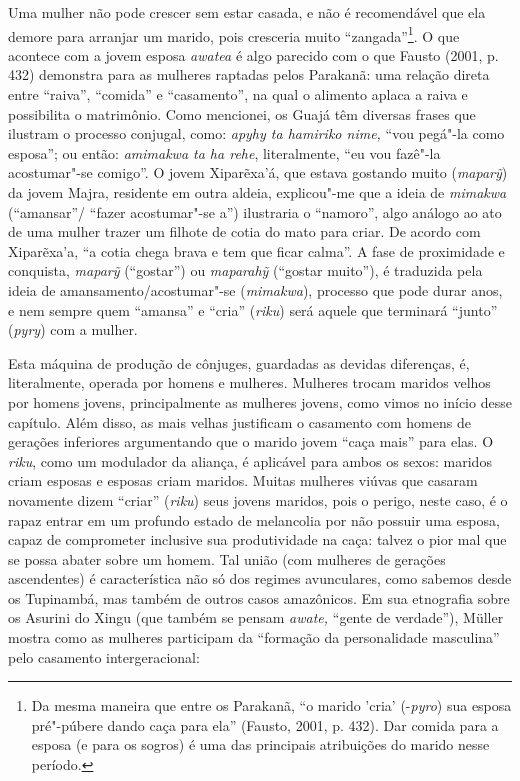 Uma mulher não pode crescer sem estar casada, e não é recomendável que
ela demore para arranjar um marido, pois cresceria muito
``zangada''\footnote{Da mesma maneira que entre os Parakanã, ``o marido
  'cria' (-\emph{pyro}) sua esposa pré"-púbere dando caça para ela''
  (Fausto, 2001, p. 432). Dar comida para a esposa (e para os sogros) é uma
  das principais atribuições do marido nesse período.}. O que acontece
com a jovem esposa \emph{awatea} é algo parecido com o que Fausto
(2001, p. 432) demonstra para as mulheres raptadas pelos Parakanã: uma
relação direta entre ``raiva'', ``comida'' e ``casamento'', na qual o
alimento aplaca a raiva e possibilita o matrimônio. Como mencionei, os
Guajá têm diversas frases que ilustram o processo conjugal, como:
\emph{apyhy ta hamiriko nime,} ``vou pegá"-la como esposa''; ou então:
\emph{amimakwa ta ha rehe}, literalmente, ``eu vou fazê"-la acostumar"-se
comigo''. O jovem Xiparẽxa'á, que estava gostando muito (\emph{maparỹ})
da jovem Majra, residente em outra aldeia, explicou"-me que a ideia de
\emph{mimakwa} (``amansar''/ ``fazer acostumar"-se a'') ilustraria o
``namoro'', algo análogo ao ato de uma mulher trazer um filhote de cotia
do mato para criar. De acordo com Xiparẽxa'a, ``a cotia chega brava e tem
que ficar calma''. A fase de proximidade e conquista, \emph{maparỹ}
(``gostar'') ou \emph{maparahỹ} (``gostar muito''), é traduzida pela ideia
de amansamento/acostumar"-se (\emph{mimakwa}), processo que pode durar
anos, e nem sempre quem ``amansa'' e ``cria'' (\emph{riku}) será aquele que
terminará ``junto'' (\emph{pyry}) com a mulher.

Esta máquina de produção de cônjuges, guardadas as devidas diferenças,
é, literalmente, operada por homens e mulheres. Mulheres trocam maridos
velhos por homens jovens, principalmente as mulheres jovens, como vimos
no início desse capítulo. Além disso, as mais velhas justificam o
casamento com homens de gerações inferiores argumentando que o marido
jovem ``caça mais'' para elas. O \emph{riku}, como um modulador da
aliança, é aplicável para ambos os sexos: maridos criam esposas e
esposas criam maridos. Muitas mulheres viúvas que casaram novamente
dizem ``criar'' (\emph{riku}) seus jovens maridos, pois o perigo, neste
caso, é o rapaz entrar em um profundo estado de melancolia por não
possuir uma esposa, capaz de comprometer inclusive sua produtividade na
caça: talvez o pior mal que se possa abater sobre um homem. Tal união
(com mulheres de gerações ascendentes) é característica não só dos
regimes avunculares, como sabemos desde os Tupinambá, mas também de
outros casos amazônicos. Em sua etnografia sobre os Asurini do Xingu
(que também se pensam \emph{awate,} ``gente de verdade''), Müller mostra
como as mulheres participam da ``formação da personalidade masculina''
pelo casamento intergeracional:

